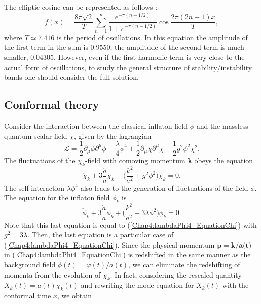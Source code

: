 \documentclass[11pt,a4paper,twoside]{book}
\begin{document}
 The elliptic cosine can be represented as follows \cite{Chap4:ModelLambdaPhi4Reference}:
 \begin{equation}
\label{Chap4:lambdaPhi4_EllipticCosineForm}
f(x)=\frac{8\pi\sqrt{2}}{T}\sum_{n=1}^{\infty}\frac{e^{-\pi(n-1/2)}}{1+e^{-\pi (n-1/2)}}\cos \frac{2\pi (2n-1)x}{T},
 \end{equation}
 where $ T \simeq 7.416 $ is the period of oscillations. In this equation the amplitude of the first term in the sum is 0.9550; the amplitude of the second term is much smaller, 0.04305. However, even if the first harmonic term is very close to the actual form of oscillations, to study the general structure of stability/instability bands one should consider the full solution.
 
 \subsection{Conformal theory}
 Consider the interaction between the classical inflaton field $\phi$ and the massless quantum scalar field $\chi$, given by the lagrangian
 \begin{equation}
\label{Chap4:lambdaPhi4_Lagrangian}
\mathcal{L}=\frac{1}{2}\partial_{\mu}\phi\partial^{\mu}\phi - \frac{\lambda }{4}\phi^{4} + \frac{1}{2}\partial_{\mu}\chi\partial^{\mu}\chi - \frac{1}{2}g^{2}\phi^{2}\chi^{2}.
 \end{equation}
 The fluctuations of the $\chi_{k}$-field with comoving momentum \textbf{k} obeys the equation
 \begin{equation}
\label{Chap4:lambdaPhi4_EquationChi}
\ddot{\chi}_{k} + 3\frac{\dot{a}}{a}\dot{\chi}_{k} + \Bigg(\frac{k^{2}}{a^{2}} + g^{2}\phi^{2}\Bigg)\chi_{k}= 0.
 \end{equation}
 The self-interaction $\lambda\phi^{4}$ also leads to the generation of fluctuations of the field $\phi$. The equation for the inflaton field $\phi_{k}$
is 
\begin{equation}
\label{Chap4:lambdaPhi4_EquationPhik}
\ddot{\phi}_{k} + 3\frac{\dot{a}}{a}\dot{\phi}_{k} + \Bigg(\frac{k^{2}}{a^{2}} + 3\lambda\phi^{2}\Bigg) \phi_{k}= 0.
\end{equation} 
Note that this last equation is equal to (\ref{Chap4:lambdaPhi4_EquationChi}) with $ g^{2}=3\lambda $. Then, the last equation is a particular case of (\ref{Chap4:lambdaPhi4_EquationChi}). Since the physical momentum $ \textbf{p}=\textbf{k}/\textbf{a(t)} $ in (\ref{Chap4:lambdaPhi4_EquationChi}) is redshifted in the same manner as the background field $ \phi(t) = \varphi(t)/a(t) $, we can eliminate the redshifting of momenta from the evolution of $\chi_{k}$. In fact, considering the rescaled quantity $ X_{k}(t) = a(t)\chi_{k}(t) $ and rewriting the mode equation for $ X_{k}(t) $ with the conformal time $ x $, we obtain
\end{document}
